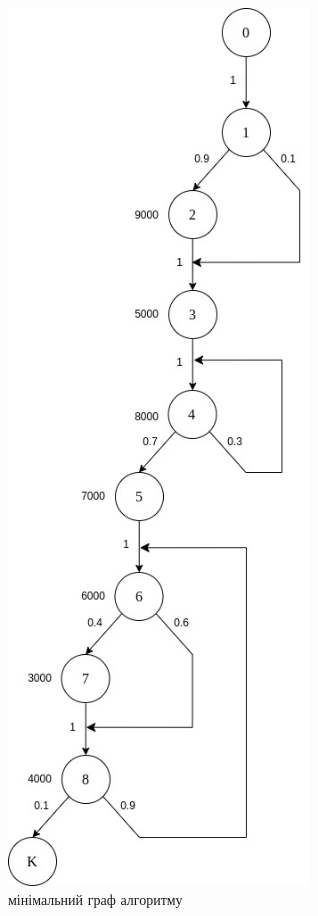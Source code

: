 \begin{figure}[h]
    \centering
    \includegraphics[width=8cm]{reports/algos/lab1/assets/5.jpg}
    \caption{мінімальний граф алгоритму}
\end{figure}

